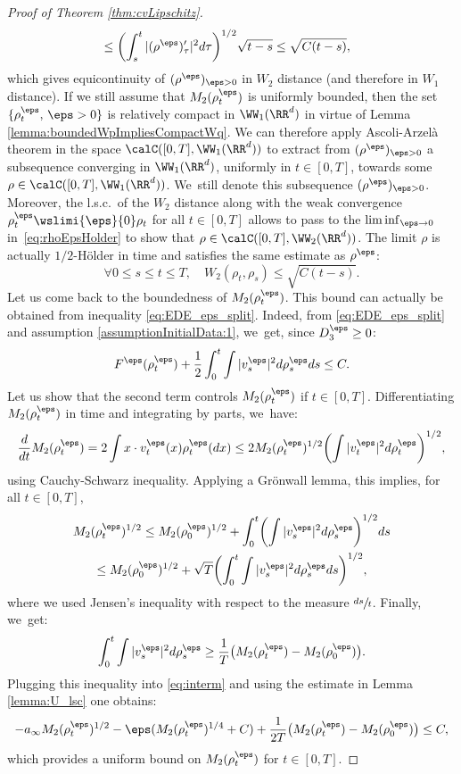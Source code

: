 \begin{proof}[Proof of Theorem \ref{thm:cvLipschitz}]
\begin{equation}
\begin{aligned}
&\leq \biggl(\int_s^t |(\rho^\eps)'_\tau|^2 d\tau \biggr)^{1/2} \sqrt{t-s} \leq \sqrt{C(t-s)},
\end{aligned}
\end{equation}
which gives equicontinuity of $(\rho^\eps)_{\eps > 0}$ in $W_2$ distance (and therefore in $W_1$ distance). If we still assume that $M_2(\rho_t^\eps)$ is uniformly bounded, then the set $\{\rho_t^\eps, \, \eps > 0\}$ is relatively compact in $\WW_1(\RR^d)$ in virtue of Lemma \ref{lemma:boundedWpImpliesCompactWq}.
We can therefore apply Ascoli-Arzelà theorem in the space $\calC([0,T], \WW _1(\RR^d))$ to extract from $(\rho^\eps)_{\eps > 0}$ a subsequence converging in $\WW_1(\RR^d)$, uniformly in $t \in [0,T]$, towards some $\rho \in \calC([0,T], \WW _1(\RR^d))$. We~still denote this subsequence $(\rho^\eps)_{\eps>0}$. Moreover, the l.s.c.\ of the $W_2$ distance along with the weak convergence $\rho_t^\eps \wslimi{\eps}{0} \rho_t$ for all $t \in [0,T]$ allows to pass to the $\liminf_{\eps \to 0}$ in~\eqref{eq:rhoEpsHolder} to show that $\rho \in \calC([0,T], \WW _2(\RR^d))$. The limit $\rho$ is actually $1/2$-Hölder in time and satisfies the same estimate as $\rho^\eps$:
\[
\forall 0 \leq s \leq t \leq T, \quad W_2(\rho_t, \rho_s) \leq \sqrt{C(t-s)}.
\]
Let us come back to the boundedness of $M_2(\rho_t^\eps)$. This bound can actually be obtained from inequality \eqref{eq:EDE_eps_split}. Indeed, from \eqref{eq:EDE_eps_split} and assumption \eqref{assumptionInitialData:1}, we~get, since $D_3^\eps \geq 0$:
\begin{equation}\label{eq:interm}
F^\eps(\rho_t^\eps) + \frac 12 \int_0^t \int |v^\eps_s|^2 d\rho^\eps_s ds \leq C.
\end{equation}
Let us show that the second term controls $M_2(\rho_t^\eps)$ if $t\in [0,T]$. Differentiating $M_2(\rho_t^\eps)$ in time and integrating by parts, we~have:
\begin{align*}
\frac{d}{dt} M_2(\rho_t^\eps) = 2 \int x \cdot v_t^\eps(x) \rho_t^\eps(dx) \leq 2 M_2(\rho_t^\eps)^{1/2} \biggl(\int |v^\eps_t|^2 d\rho^\eps_t \biggr)^{1/2},
\end{align*}
using Cauchy-Schwarz inequality. Applying a Grönwall lemma, this implies, for all $t\in [0,T]$,
\begin{multline*}
M_2(\rho_t^\eps)^{1/2} \leq M_2(\rho_0^\eps)^{1/2} + \int_0^t \biggl(\int |v^\eps_s|^2 d\rho^\eps_s \biggr)^{1/2} ds \\
\leq M_2(\rho_0^\eps)^{1/2} + \sqrt{T} \biggl(\int_0^t \int |v^\eps_s|^2 d\rho^\eps_s ds \biggr)^{1/2},
\end{multline*}
where we used Jensen's inequality with respect to the measure $\sfrac{ds}{t}$. Finally, we~get:
\[
\int_0^t \int |v^\eps_s|^2 d\rho^\eps_s \geq \frac{1}{T}\big(M_2(\rho_t^\eps) - M_2(\rho_0^\eps)\big).
\]
Plugging this inequality into \eqref{eq:interm} and using the estimate in Lemma \ref{lemma:U_lsc} one obtains:
\[
- a_\infty M_2(\rho_t^\eps)^{1/2} - \eps (M_2(\rho_t^\eps)^{1/4} +C) + \frac{1}{2T}\big(M_2(\rho_t^\eps) - M_2(\rho_0^\eps)\big) \leq C,
\]
which provides a uniform bound on $M_2(\rho_t^\eps)$ for $t \in [0, T]$.


\end{proof}
